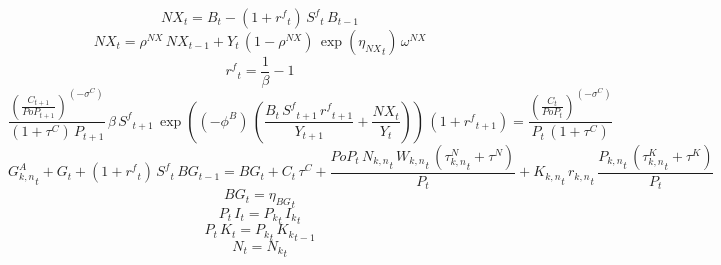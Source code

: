 \begin{dmath}
{NX}_{t}={B}_{t}-\left(1+{{r^{f}}}_{t}\right)\, {S^{f}}_{t}\, {B}_{t-1}
\end{dmath}
\noindent[name= `LOM net exports']
\begin{dmath}
{NX}_{t}={{\rho^{NX}}}\, {NX}_{t-1}+{Y}_{t}\, \left(1-{{\rho^{NX}}}\right)\, \exp\left({{\eta_{NX}}}_{t}\right)\, {{\omega^{NX}}}
\end{dmath}
\noindent[name= `world interest rate']
\begin{dmath}
{{r^{f}}}_{t}=\frac{1}{{{\beta}}}-1
\end{dmath}
\noindent[name= `foreign assets']
\begin{dmath}
\frac{\left(\frac{{C}_{t+1}}{{PoP}_{t+1}}\right)^{\left(-{{\sigma^{C}}}\right)}}{\left(1+{{\tau^{C}}}\right)\, {P}_{t+1}}\, {{\beta}}\, {S^{f}}_{t+1}\, \exp\left(\left(-{{\phi^{B}}}\right)\, \left(\frac{{B}_{t}\, {S^{f}}_{t+1}\, {{r^{f}}}_{t+1}}{{Y}_{t+1}}+\frac{{NX}_{t}}{{Y}_{t}}\right)\right)\, \left(1+{{r^{f}}}_{t+1}\right)=\frac{\left(\frac{{C}_{t}}{{PoP}_{t}}\right)^{\left(-{{\sigma^{C}}}\right)}}{{P}_{t}\, \left(1+{{\tau^{C}}}\right)}
\end{dmath}
\noindent[name= `government budget constraint']
\begin{dmath}
{{G^{A}_{k,n}}}_{t}+{G}_{t}+\left(1+{{r^{f}}}_{t}\right)\, {S^{f}}_{t}\, {BG}_{t-1}={BG}_{t}+{C}_{t}\, {{\tau^{C}}}+\frac{{PoP}_{t}\, {{N_{k,n}}}_{t}\, {{W_{k,n}}}_{t}\, \left({{\tau^{N}_{k,n}}}_{t}+{{\tau^{N}}}\right)}{{P}_{t}}+{{K_{k,n}}}_{t}\, {{r_{k,n}}}_{t}\, \frac{{{P_{k,n}}}_{t}\, \left({{\tau^{K}_{k,n}}}_{t}+{{\tau^{K}}}\right)}{{P}_{t}}
\end{dmath}
\noindent[name= `government budget constraint']
\begin{dmath}
{BG}_{t}={{\eta_{BG}}}_{t}
\end{dmath}
\noindent[name= `aggregate investment']
\begin{dmath}
{P}_{t}\, {I}_{t}={{P_k}}_{t}\, {{I_k}}_{t}
\end{dmath}
\noindent[name= `aggregate capital']
\begin{dmath}
{P}_{t}\, {K}_{t}={{P_k}}_{t}\, {{K_k}}_{t-1}
\end{dmath}
\noindent[name= `aggregate labour']
\begin{dmath}
{N}_{t}={{N_k}}_{t}
\end{dmath}
